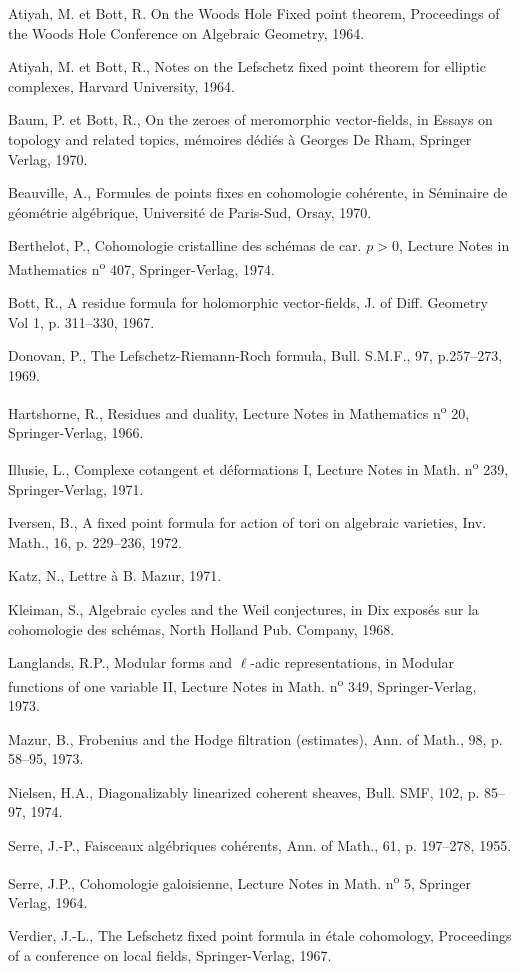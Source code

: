 \documentclass[11pt]{article}
\begin{document}
\begin{enumerate}[label={[\arabic*]},leftmargin=2.5em]
\item Atiyah, M. et Bott, R. On the Woods Hole Fixed point theorem, Proceedings of the Woods Hole Conference on Algebraic Geometry, 1964.
\item Atiyah, M. et Bott, R., Notes on the Lefschetz fixed point theorem for elliptic complexes, Harvard University, 1964.
\item Baum, P. et Bott, R., On the zeroes of meromorphic vector-fields, in Essays on topology and related topics, mémoires dédiés à Georges De Rham, Springer Verlag, 1970.
\item Beauville, A., Formules de points fixes en cohomologie cohérente, in Séminaire de géométrie algébrique, Université de Paris-Sud, Orsay, 1970.
\item Berthelot, P., Cohomologie cristalline des schémas de car. $p>0$, Lecture Notes in Mathematics n\textsuperscript{o} 407, Springer-Verlag, 1974.
\item Bott, R., A residue formula for holomorphic vector-fields, J. of Diff. Geometry Vol 1, p. 311--330, 1967.
\item Donovan, P., The Lefschetz-Riemann-Roch formula, Bull. S.M.F., 97, p.257--273, 1969.
\item Hartshorne, R., Residues and duality, Lecture Notes in Mathematics n\textsuperscript{o} 20, Springer-Verlag, 1966.
\item Illusie, L., Complexe cotangent et déformations I, Lecture Notes in Math. n\textsuperscript{o} 239, Springer-Verlag, 1971.
\item Iversen, B., A fixed point formula for action of tori on algebraic varieties, Inv. Math., 16, p. 229--236, 1972.
\item Katz, N., Lettre à B. Mazur, 1971.
\item Kleiman, S., Algebraic cycles and the Weil conjectures, in Dix exposés sur la cohomologie des schémas, North Holland Pub. Company, 1968.
\item Langlands, R.P., Modular forms and $\ell$-adic representations, in Modular functions of one variable II, Lecture Notes in Math. n\textsuperscript{o} 349, Springer-Verlag, 1973.
\item Mazur, B., Frobenius and the Hodge filtration (estimates), Ann. of Math., 98, p. 58--95, 1973.
\item Nielsen, H.A., Diagonalizably linearized coherent sheaves, Bull. SMF, 102, p. 85--97, 1974.
\item Serre, J.-P., Faisceaux algébriques cohérents, Ann. of Math., 61, p. 197--278, 1955.
\item Serre, J.P., Cohomologie galoisienne, Lecture Notes in Math. n\textsuperscript{o} 5, Springer Verlag, 1964.
\item Verdier, J.-L., The Lefschetz fixed point formula in étale cohomology, Proceedings of a conference on local fields, Springer-Verlag, 1967.
\end{enumerate}
\end{document}
